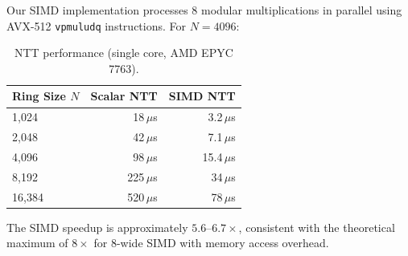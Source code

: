 Our SIMD implementation processes 8 modular multiplications in parallel using AVX-512
\texttt{vpmuludq} instructions. For $N = 4096$:

\begin{table}[ht]
\centering
\caption{NTT performance (single core, AMD EPYC 7763).}
\label{tab:ntt-benchmarks}
\begin{tabular}{lrr}
\toprule
\textbf{Ring Size $N$} & \textbf{Scalar NTT} & \textbf{SIMD NTT} \\
\midrule
1{,}024 & 18\,$\mu$s & 3.2\,$\mu$s \\
2{,}048 & 42\,$\mu$s & 7.1\,$\mu$s \\
4{,}096 & 98\,$\mu$s & 15.4\,$\mu$s \\
8{,}192 & 225\,$\mu$s & 34\,$\mu$s \\
16{,}384 & 520\,$\mu$s & 78\,$\mu$s \\
\bottomrule
\end{tabular}
\end{table}

The SIMD speedup is approximately $5.6\text{--}6.7\times$, consistent with the
theoretical maximum of $8\times$ for 8-wide SIMD with memory access overhead.

